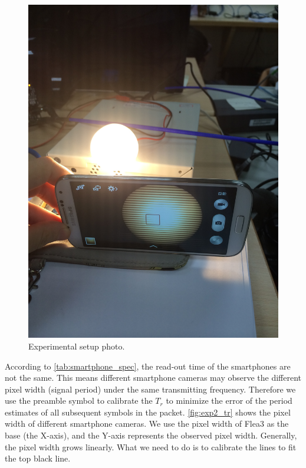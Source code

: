 \begin{figure}[!htb]
  \centering
  \includegraphics[scale=0.0375]{fig/exp2_setup.JPG}
  \caption{Experimental setup photo.}
  \label{fig:exp2_setup}
\end{figure}

According to \autoref{tab:smartphone_spec}, the read-out time of the smartphones are not the same. This means different smartphone cameras may observe the different pixel width (signal period) under the same transmitting frequency. Therefore we use the preamble symbol to calibrate the $T_r$ to minimize the error of the period estimates of all subsequent symbols in the packet. \autoref{fig:exp2_tr} shows the pixel width of different smartphone cameras. We use the pixel width of Flea3 as the base (the X-axis), and the Y-axis represents the observed pixel width. Generally, the pixel width grows linearly. What we need to do is to calibrate the lines to fit the top black line. 

